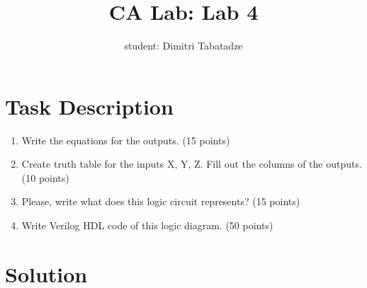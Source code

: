 \documentclass{article}
\title{CA Lab: Lab 4}
\author{student: Dimitri Tabatadze}
\begin{document}
    \maketitle

    \section*{Task Description} 
    
    \begin{enumerate}[label={\alph*)}]
        \item {Write the equations for the outputs. (15 points)}
        \item {Create truth table for the inputs X, Y, Z. Fill out the columns of the outputs. (10 points)}
        \item {Please, write what does this logic circuit represents? (15 points)}
        \item {Write Verilog HDL code of this logic diagram. (50 points)}
    \end{enumerate}

    \section*{Solution}
    
\end{document}

